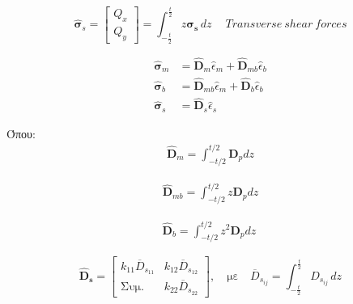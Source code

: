 \begin{equation}
    \hat{\boldsymbol{\sigma}}_{s} = \begin{bmatrix}
    Q_x \\
    Q_y
    \end{bmatrix} = \int_{-\frac{t}{2}}^{\frac{t}{2}} z \boldsymbol{\sigma}_{\mathbf{s}} \, dz \quad \ Transverse \ shear \ forces
\end{equation}
    
\begin{align}
    \hat{\boldsymbol{\sigma}}_{m} &= {\hat{\mathbf{D}}}_{m}{\hat{\epsilon}}_{m} + {\hat{\mathbf{D}}}_{mb}{\hat{\epsilon}}_{b} \\
    \hat{\boldsymbol{\sigma}}_{b} &= {\hat{\mathbf{D}}}_{mb}{\hat{\epsilon}}_{m} + {\hat{\mathbf{D}}}_{b}{\hat{\epsilon}}_{b} \\
    \hat{\boldsymbol{\sigma}}_{s} &= {\hat{\mathbf{D}}}_{s}{\hat{\epsilon}}_{s}
\end{align}
    

Όπου:
\begin{equation}
    \label{eq:Dm}
\begin{array}{r}
{\hat{\mathbf{D}}}_{m} = \int_{- t/2}^{t/2}{\mathbf{D}_{p}dz} 
\end{array}
\end{equation}


\begin{equation} 
    \label{eq:Dmb}  
\begin{array}{r}
{\hat{\mathbf{D}}}_{mb} = \int_{- t/2}^{t/2}{z\mathbf{D}_{p}dz}
\end{array}
\end{equation}

\begin{equation}
    \label{eq:Db}
\begin{array}{r}
{\hat{\mathbf{D}}}_{b} = \int_{- t/2}^{t/2}{z^{2}\mathbf{D}_{p}dz}\
\end{array}
\end{equation}


\begin{equation}
    \label{eq:Dshear}    
\hat{\mathbf{D}}_{\mathbf{s}} =
\begin{bmatrix}
k_{11} \overline{D}_{s_{11}} & k_{12} \overline{D}_{s_{12}} \\
\text{Συμ.} & k_{22} \overline{D}_{s_{22}}
\end{bmatrix}, \quad
\text{με} \quad
\overline{D}_{s_{ij}} = \int_{- \frac{t}{2}}^{\frac{t}{2}} D_{s_{ij}} \, dz
\end{equation}




